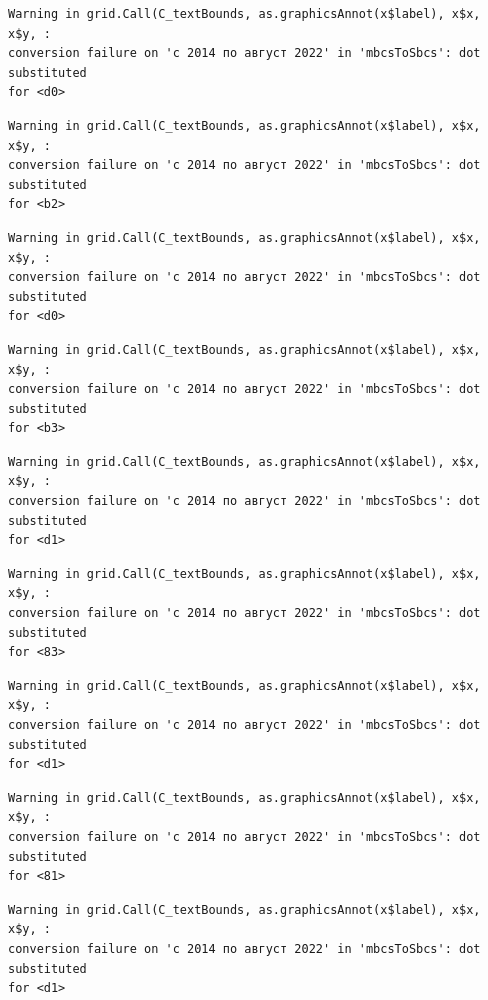\documentclass[
  letterpaper,
  DIV=11,
  numbers=noendperiod]{scrartcl}
\begin{document}
\begin{verbatim}
Warning in grid.Call(C_textBounds, as.graphicsAnnot(x$label), x$x, x$y, :
conversion failure on 'с 2014 по август 2022' in 'mbcsToSbcs': dot substituted
for <d0>
\end{verbatim}

\begin{verbatim}
Warning in grid.Call(C_textBounds, as.graphicsAnnot(x$label), x$x, x$y, :
conversion failure on 'с 2014 по август 2022' in 'mbcsToSbcs': dot substituted
for <b2>
\end{verbatim}

\begin{verbatim}
Warning in grid.Call(C_textBounds, as.graphicsAnnot(x$label), x$x, x$y, :
conversion failure on 'с 2014 по август 2022' in 'mbcsToSbcs': dot substituted
for <d0>
\end{verbatim}

\begin{verbatim}
Warning in grid.Call(C_textBounds, as.graphicsAnnot(x$label), x$x, x$y, :
conversion failure on 'с 2014 по август 2022' in 'mbcsToSbcs': dot substituted
for <b3>
\end{verbatim}

\begin{verbatim}
Warning in grid.Call(C_textBounds, as.graphicsAnnot(x$label), x$x, x$y, :
conversion failure on 'с 2014 по август 2022' in 'mbcsToSbcs': dot substituted
for <d1>
\end{verbatim}

\begin{verbatim}
Warning in grid.Call(C_textBounds, as.graphicsAnnot(x$label), x$x, x$y, :
conversion failure on 'с 2014 по август 2022' in 'mbcsToSbcs': dot substituted
for <83>
\end{verbatim}

\begin{verbatim}
Warning in grid.Call(C_textBounds, as.graphicsAnnot(x$label), x$x, x$y, :
conversion failure on 'с 2014 по август 2022' in 'mbcsToSbcs': dot substituted
for <d1>
\end{verbatim}

\begin{verbatim}
Warning in grid.Call(C_textBounds, as.graphicsAnnot(x$label), x$x, x$y, :
conversion failure on 'с 2014 по август 2022' in 'mbcsToSbcs': dot substituted
for <81>
\end{verbatim}

\begin{verbatim}
Warning in grid.Call(C_textBounds, as.graphicsAnnot(x$label), x$x, x$y, :
conversion failure on 'с 2014 по август 2022' in 'mbcsToSbcs': dot substituted
for <d1>
\end{verbatim}
\end{document}
